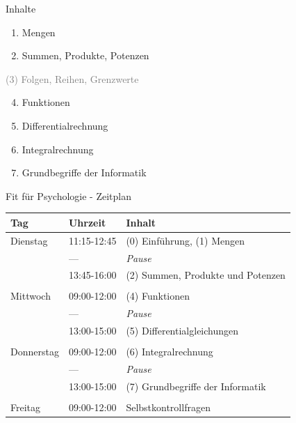 \documentclass[
  8pt,
  ignorenonframetext,
  t]{beamer}
\begin{document}
\begin{frame}{Inhalte}
\protect\hypertarget{inhalte}{}
\large
\vfill

\begin{enumerate}
[(1)]
\item
  Mengen
\item
  Summen, Produkte, Potenzen
\end{enumerate}

\textcolor{gray}{(3) Folgen, Reihen, Grenzwerte}

\begin{enumerate}
[(1)]
\setcounter{enumi}{3}
\item
  Funktionen
\item
  Differentialrechnung
\item
  Integralrechnung
\item
  Grundbegriffe der Informatik \vfill
\end{enumerate}
\end{frame}

\begin{frame}{Fit für Psychologie - Zeitplan}
\protect\hypertarget{fit-fuxfcr-psychologie---zeitplan}{}
\vspace{12mm}

\small

\begin{longtable}[]{@{}lll@{}}
\toprule()
Tag & Uhrzeit & Inhalt \\
\midrule()
\endhead
Dienstag & 11:15-12:45 & (0) Einführung, (1) Mengen \\
& --- & \emph{Pause} \\
& 13:45-16:00 & (2) Summen, Produkte und Potenzen \\
& & \\
Mittwoch & 09:00-12:00 & (4) Funktionen \\
& --- & \emph{Pause} \\
& 13:00-15:00 & (5) Differentialgleichungen \\
& & \\
Donnerstag & 09:00-12:00 & (6) Integralrechnung \\
& --- & \emph{Pause} \\
& 13:00-15:00 & (7) Grundbegriffe der Informatik \\
& & \\
Freitag & 09:00-12:00 & Selbstkontrollfragen \\
\bottomrule()
\end{longtable}
\end{frame}
\end{document}
